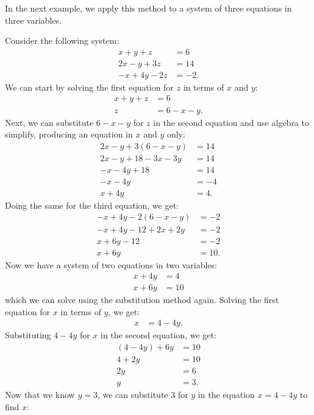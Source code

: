 \documentclass{article}
\begin{document}
In the next example, we apply this method to a system of three equations in three variables.

\begin{example}\label{ex:substitution-method-2}
Consider the following system:
\begin{align*}
    x+y+z&=6 \\
    2x-y+3z&=14 \\
    -x+4y-2z&=-2.
\end{align*}
We can start by solving the first equation for \(z\) in terms of \(x\) and \(y\):
\begin{align*}
    x+y+z&=6 \\
    z&=6-x-y.
\end{align*}
Next, we can substitute \(6-x-y\) for \(z\) in the second equation and use algebra to simplify, producing an equation in \(x\) and \(y\) only:
\begin{align*}
    2x-y+3(6-x-y)&=14 \\
    2x-y+18-3x-3y&=14 \\
    -x-4y+18&=14 \\
    -x-4y&=-4 \\
    x+4y&=4.
\end{align*}
Doing the same for the third equation, we get:
\begin{align*}
    -x+4y-2(6-x-y)&=-2 \\
    -x+4y-12+2x+2y&=-2 \\
    x+6y-12&=-2 \\
    x+6y&=10.
\end{align*}
Now we have a system of two equations in two variables:
\begin{align*}
    x+4y&=4 \\
    x+6y&=10
\end{align*}
which we can solve using the substitution method again. Solving the first equation for \(x\) in terms of \(y\), we get:
\begin{align*}
    x&=4-4y.
\end{align*}
Substituting \(4-4y\) for \(x\) in the second equation, we get:
\begin{align*}
    (4-4y)+6y&=10 \\
    4+2y&=10 \\
    2y&=6 \\
    y&=3.
\end{align*}
Now that we know \(y=3\), we can substitute \(3\) for \(y\) in the equation \(x=4-4y\) to find \(x\):
\begin{align*}

\end{align*}
\end{example}
\end{document}
